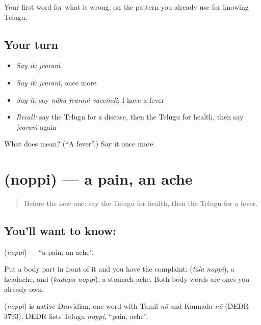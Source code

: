 \begin{grammarlens}[title={What you've built}]
Your first word for what is wrong, on the pattern you already use for knowing Telugu.
\end{grammarlens}

\subsection*{Your turn}
\begin{itemize}
\raggedright
  \item \emph{Say it:} \emph{jvaraṁ}
  \item \emph{Say it:} \emph{jvaraṁ}, once more
  \item \emph{Say it:} say \emph{nāku jvaraṁ vaccindi}, I have a fever
  \item \emph{Recall:} say the Telugu for a disease, then the Telugu for health, then say \emph{jvaraṁ} again
\end{itemize}

\begin{tcolorbox}[breakable,colback=teal!4,colframe=teal!35!black,title={Before you move on}]
What does  mean? (\textquotedblleft{}A fever\textquotedblright{}.) Say it once more.
\end{tcolorbox}
\section[\texorpdfstring{\te{నొప్పి} (noppi)}{నొప్పి (noppi)}]{ (noppi) — a pain, an ache}

\label{lesson:TE-C84-pain}



\begin{quote}
Before the new one: say the Telugu for health, then the Telugu for a fever.
\end{quote}

\subsection*{You'll want to know: }
\textbf{} (\emph{noppi}) — \textquotedblleft{}a pain, an ache\textquotedblright{}.

Put a body part in front of it and you have the complaint: \textbf{ } (\emph{tala noppi}), a headache, and \textbf{ } (\emph{kaḍupu noppi}), a stomach ache. Both body words are ones you already own.

\begin{cousinweb}
\textbf{} (\emph{noppi}) is native Dravidian, one word with Tamil \emph{nō} and Kannada \emph{nō} (DEDR 3793). DEDR lists Telugu \emph{noppi}, \textquotedblleft{}pain, ache\textquotedblright{}.
\end{cousinweb}

